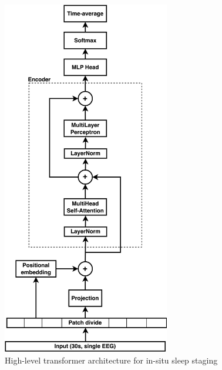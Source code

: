 \begin{figure}
    \centering
    \caption{High-level transformer architecture for in-situ sleep staging}
    \includegraphics[width=0.65\textwidth]{assets/ViT.png}
\end{figure}
\label{fig:vit}

